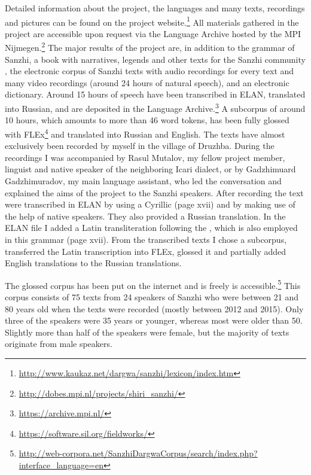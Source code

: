 \sloppy Detailed information about the project, the languages and many texts, recordings and pictures can be found on the project website.\footnote{\url{http://www.kaukaz.net/dargwa/sanzhi/lexicon/index.htm}} All materials gathered in the project are accessible upon request via the Language Archive hosted by the MPI Nijmegen.\footnote{\url{http://dobes.mpi.nl/projects/shiri_sanzhi/}} The major results of the project are, in addition to the grammar of Sanzhi, a book with narratives, legends and other texts for the Sanzhi community \citep{Forker.Gadzhimuradov2017}, the electronic corpus of Sanzhi texts with audio recordings for every text and many video recordings (around 24 hours of natural speech), and an electronic dictionary. Around 15 hours of speech have been transcribed in ELAN, translated into Russian, and are deposited in the Language Archive.\footnote{\url{https://archive.mpi.nl/}} A subcorpus of around 10 hours, which amounts to more than 46 word tokens, has been fully glossed with FLEx\footnote{\url{https://software.sil.org/fieldworks/}} and translated into Russian and English. The texts have almost exclusively been recorded by myself in the village of Druzhba. During the recordings I was accompanied by Rasul Mutalov, my fellow project member, linguist and native speaker of the neighboring Icari dialect, or by Gadzhimuard Gadzhimuradov, my main language assistant, who led the conversation and explained the aims of the project to the Sanzhi speakers. After recording the text were transcribed in ELAN by using a Cyrillic  (page xvii) and by making use of the help of native speakers. They also provided a Russian translation. In the ELAN file I added a Latin transliteration following the , which is also employed in this grammar (page xvii). From the transcribed texts I chose a subcorpus, transferred the Latin transcription into FLEx, glossed it and partially added English translations to the Russian translations.

The glossed corpus has been put on the internet and is freely is accessible.\footnote{\url{http://web-corpora.net/SanzhiDargwaCorpus/search/index.php?interface_language=en}} This corpus consists of 75 texts from 24 speakers of Sanzhi who were between 21 and 80 years old when the texts were recorded (mostly between 2012 and 2015). Only three of the speakers were 35 years or younger, whereas most were older than 50. Slightly more than half of the speakers were female, but the majority of texts originate from male speakers.

